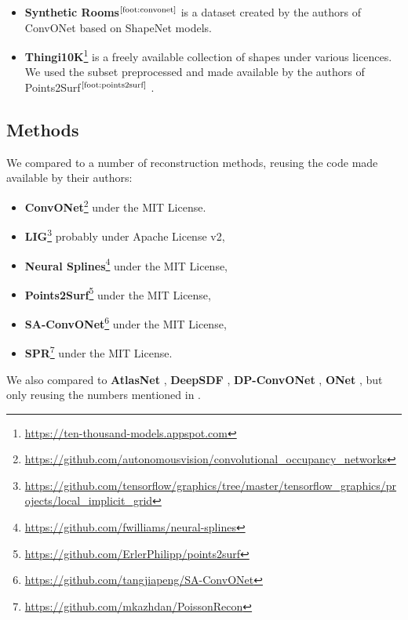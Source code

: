 \documentclass[10pt,twocolumn,letterpaper]{article}
\newcommand{\footnoteref}[1]{$^{\text{\ref{#1}}}$}
\begin{document}
\begin{itemize}[itemsep=4pt,topsep=4pt, parsep=0pt]
    \item \textbf{Synthetic Rooms}\footnoteref{foot:convonet} is a dataset created by the authors of ConvONet \cite{Peng2020ECCV} based on ShapeNet models.

    \item \textbf{Thingi10K}\footnote{\label{foot:thingi10k}\url{https://ten-thousand-models.appspot.com}} \cite{zhou2016thingi10k} is a freely available collection of shapes under various licences. We used the subset preprocessed and made available by the authors of Points2Surf\footnoteref{foot:points2surf} \cite{Erler2020Points2Surf}.

\end{itemize}


\subsection{Methods}\label{sec:assetsmethods}

We compared to a number of reconstruction methods, reusing the code made available by their authors:
\begin{itemize}[itemsep=4pt,topsep=4pt, parsep=0pt]

\item \textbf{ConvONet}\footnote{\label{foot:convonet}\url{https://github.com/autonomousvision/convolutional_occupancy_networks}} \cite{Peng2020ECCV} under the MIT License.

\item \textbf{LIG}\footnote{\label{foot:lig}\url{https://github.com/tensorflow/graphics/tree/master/tensorflow_graphics/projects/local_implicit_grid}} \cite{Jiang2020CVPR} probably under Apache License v2,

\item \textbf{Neural Splines}\footnote{\label{foot:neuralsplines}\url{https://github.com/fwilliams/neural-splines}} \cite{Williams2021NeuralSplines}  under the
MIT License,

\item \textbf{Points2Surf}\footnote{\label{foot:points2surf}\url{https://github.com/ErlerPhilipp/points2surf}} \cite{Erler2020Points2Surf} under the MIT License,

\item \textbf{SA-ConvONet}\footnote{\label{foot:saconvonet}\url{https://github.com/tangjiapeng/SA-ConvONet}} \cite{tang2021sign} under the MIT License,

\item \textbf{SPR}\footnote{\label{foot:spr}\url{https://github.com/mkazhdan/PoissonRecon}} \cite{Kazhdan2013SIGGRAPH} under the MIT License.

\end{itemize}
We also compared to \textbf{AtlasNet} \cite{Groueix2018CVPR}, \textbf{DeepSDF} \cite{Park2019CVPR}, \textbf{DP-ConvONet} \cite{Lionar_2021_WACV}, \textbf{ONet} \cite{Mescheder2019CVPR}, but only reusing the numbers mentioned in \cite{Peng2020ECCV, Lionar_2021_WACV}.
\end{document}
